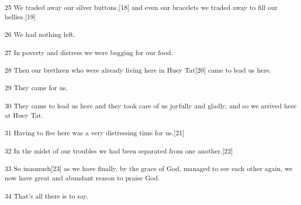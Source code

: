 {\textsuperscript{25 We traded away our silver buttons,[18] and even our
bracelets we traded away to fill our bellies.[19]}}

{\textsuperscript{26 We had nothing left. }}

{\textsuperscript{27 In poverty and distress we were begging for our food.}}

{\textsuperscript{28 Then our brethren who were already living here in Huey
Tat[20] came to lead us here. }}

{\textsuperscript{29 They came for us. }}

{\textsuperscript{30 They came to lead us here and they took care of us
joyfully and gladly, and so we arrived here at Huey Tat. }}

{\textsuperscript{31 Having to flee here was a very distressing time for
us.[21]}}

{\textsuperscript{32 In the midst of our troubles we had been separated
from one another.[22]}}

{\textsuperscript{33 So inasmuch[23] as we have finally, by the grace of
God, managed to see each other again, we now have great and abundant reason to
praise God. }}

{\textsuperscript{34 That's all there is to say.}}


